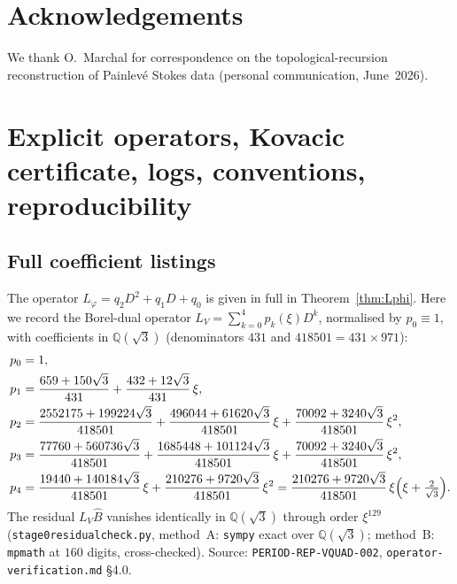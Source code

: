 \documentclass[11pt,reqno]{amsart}
\renewcommand{\_}{\vquadorigunderscore\allowbreak}
\theoremstyle{plain}
\theoremstyle{definition}
\newcommand{\Bhat}{\widehat{B}}
\newcommand{\Lphi}{L_{\varphi}}
\newcommand{\LV}{L_{V}}
\newcommand{\Qsqrt}{\mathbb{Q}(\sqrt3)}
\begin{document}
\section*{Acknowledgements}
We thank O.~Marchal for correspondence on the topological-recursion reconstruction of Painlev\'e
Stokes data (personal communication, June~2026).

\appendix
\section{Explicit operators, Kovacic certificate, logs, conventions, reproducibility}\label{app:all}

\subsection{Full coefficient listings}\label{app:coeffs}
The operator $\Lphi=q_2D^2+q_1D+q_0$ is given in full in Theorem~\ref{thm:Lphi}. Here we record
the Borel-dual operator $\LV=\sum_{k=0}^4 p_k(\xi)D^k$, normalised by $p_0\equiv1$, with
coefficients in $\Qsqrt$ (denominators $431$ and $418501=431\times971$):
\begin{align*}
  p_0&=1,\\
  p_1&=\frac{659+150\sqrt3}{431}+\frac{432+12\sqrt3}{431}\,\xi,\\
  p_2&=\frac{2552175+199224\sqrt3}{418501}
       +\frac{496044+61620\sqrt3}{418501}\,\xi
       +\frac{70092+3240\sqrt3}{418501}\,\xi^2,\\
  p_3&=\frac{77760+560736\sqrt3}{418501}
       +\frac{1685448+101124\sqrt3}{418501}\,\xi
       +\frac{70092+3240\sqrt3}{418501}\,\xi^2,\\
  p_4&=\frac{19440+140184\sqrt3}{418501}\,\xi
       +\frac{210276+9720\sqrt3}{418501}\,\xi^2
       =\frac{210276+9720\sqrt3}{418501}\,\xi\Bigl(\xi+\tfrac{2}{\sqrt3}\Bigr).
\end{align*}
The residual $\LV\Bhat$ vanishes identically in $\Qsqrt$ through order $\xi^{129}$
(\texttt{stage0\_residual\_check.py}, method~A: \texttt{sympy} exact over $\Qsqrt$; method~B:
\texttt{mpmath} at $160$ digits, cross-checked). Source: \texttt{PERIOD-REP-VQUAD-002},
\texttt{operator-verification.md} \S4.0.
\end{document}
